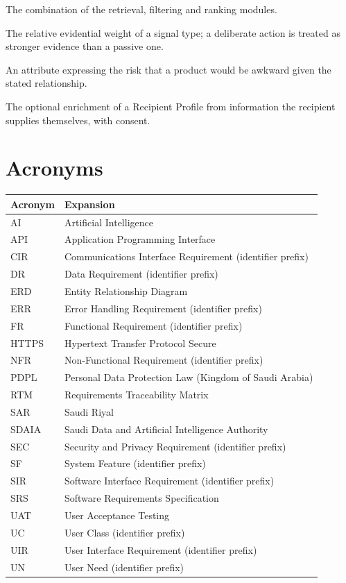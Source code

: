 \documentclass[11pt,a4paper]{report}
\begin{document}
\begin{description}[style=nextline,leftmargin=0pt]
\item[Recommendation engine] The combination of the retrieval, filtering and ranking modules.
\item[Signal strength] The relative evidential weight of a signal type; a deliberate action is treated as stronger evidence than a passive one.
\item[Social-appropriateness (embarrassment risk)] An attribute expressing the risk that a product would be awkward given the stated relationship.
\item[TikTok personalisation] The optional enrichment of a Recipient Profile from information the recipient supplies themselves, with consent.
\end{description}

\chapter{Acronyms}
\label{app:acronyms}
\begin{table}[htbp]
\centering\small
\begin{tabularx}{\textwidth}{@{}lX@{}}
\toprule
\textbf{Acronym} & \textbf{Expansion} \\ \midrule
AI & Artificial Intelligence \\
API & Application Programming Interface \\
CIR & Communications Interface Requirement (identifier prefix) \\
DR & Data Requirement (identifier prefix) \\
ERD & Entity Relationship Diagram \\
ERR & Error Handling Requirement (identifier prefix) \\
FR & Functional Requirement (identifier prefix) \\
HTTPS & Hypertext Transfer Protocol Secure \\
NFR & Non-Functional Requirement (identifier prefix) \\
PDPL & Personal Data Protection Law (Kingdom of Saudi Arabia) \\
RTM & Requirements Traceability Matrix \\
SAR & Saudi Riyal \\
SDAIA & Saudi Data and Artificial Intelligence Authority \\
SEC & Security and Privacy Requirement (identifier prefix) \\
SF & System Feature (identifier prefix) \\
SIR & Software Interface Requirement (identifier prefix) \\
SRS & Software Requirements Specification \\
UAT & User Acceptance Testing \\
UC & User Class (identifier prefix) \\
UIR & User Interface Requirement (identifier prefix) \\
UN & User Need (identifier prefix) \\
\bottomrule
\end{tabularx}
\end{table}
\end{document}
